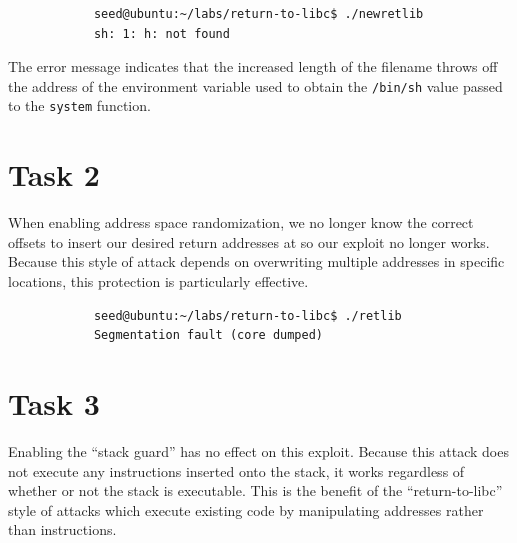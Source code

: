 \documentclass[12pt,letterpaper]{article}
\begin{document}
		\begin{verbatim}
			seed@ubuntu:~/labs/return-to-libc$ ./newretlib 
			sh: 1: h: not found
		\end{verbatim}
		
		The error message indicates that the increased length of the filename throws off the address of the environment variable used to obtain the \texttt{/bin/sh} value passed to the \texttt{system} function.
	
	\section*{Task 2}
		When enabling address space randomization, we no longer know the correct offsets to insert our desired return addresses at so our exploit no longer works. Because this style of attack depends on overwriting multiple addresses in specific locations, this protection is particularly effective.
		
		\begin{verbatim}
			seed@ubuntu:~/labs/return-to-libc$ ./retlib
			Segmentation fault (core dumped)
		\end{verbatim}
		
	\section*{Task 3}
		Enabling the ``stack guard'' has no effect on this exploit. Because this attack does not execute any instructions inserted onto the stack, it works regardless of whether or not the stack is executable. This is the benefit of the ``return-to-libc'' style of attacks which execute existing code by manipulating addresses rather than instructions.
\end{document}
